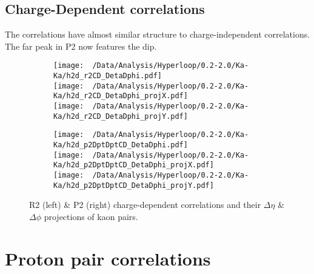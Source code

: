 \documentclass[12pt,a4paper,twoside]{report}
\begin{document}
\subsection{Charge-Dependent correlations}
The correlations have almost similar structure to charge-independent correlations. The far peak in P2 now features the dip.
\begin{figure}[H]
	\begin{subfigure}{0.49\linewidth}
		\texttt{[image: ~/Data/Analysis/Hyperloop/0.2-2.0/Ka-Ka/h2d\_r2CD\_DetaDphi.pdf]}\\
		\texttt{[image: ~/Data/Analysis/Hyperloop/0.2-2.0/Ka-Ka/h2d\_r2CD\_DetaDphi\_projX.pdf]}\\
		\texttt{[image: ~/Data/Analysis/Hyperloop/0.2-2.0/Ka-Ka/h2d\_r2CD\_DetaDphi\_projY.pdf]}\\
	\end{subfigure}
	\begin{subfigure}{0.49\linewidth}
		\texttt{[image: ~/Data/Analysis/Hyperloop/0.2-2.0/Ka-Ka/h2d\_p2DptDptCD\_DetaDphi.pdf]}\\
		\texttt{[image: ~/Data/Analysis/Hyperloop/0.2-2.0/Ka-Ka/h2d\_p2DptDptCD\_DetaDphi\_projX.pdf]}\\
		\texttt{[image: ~/Data/Analysis/Hyperloop/0.2-2.0/Ka-Ka/h2d\_p2DptDptCD\_DetaDphi\_projY.pdf]}\\
	\end{subfigure}
	\caption{R2 (left) \& P2 (right) charge-dependent correlations and their $\Delta\eta$ \& $\Delta\phi$ projections of kaon pairs.}
\end{figure}
\section{Proton pair correlations}
\end{document}
